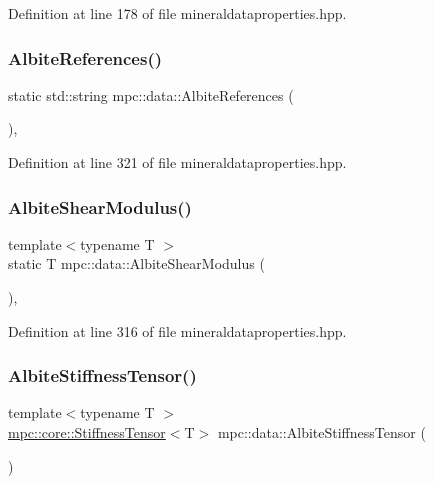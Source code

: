 Definition at line 178 of file mineraldataproperties.\+hpp.

\mbox{\label{namespacempc_1_1data_afa959db50e7cfd9c57b14f7ab5b58888}} 
\subsubsection{\texorpdfstring{Albite\+References()}{AlbiteReferences()}}
{\footnotesize\ttfamily static std\+::string mpc\+::data\+::\+Albite\+References (\begin{DoxyParamCaption}{ }\end{DoxyParamCaption})\hspace{0.3cm}{\ttfamily [inline]}, {\ttfamily [static]}}



Definition at line 321 of file mineraldataproperties.\+hpp.

\mbox{\label{namespacempc_1_1data_afaaeae63580831419afe4a20b13b35cf}} 
\subsubsection{\texorpdfstring{Albite\+Shear\+Modulus()}{AlbiteShearModulus()}}
{\footnotesize\ttfamily template$<$typename T $>$ \\
static T mpc\+::data\+::\+Albite\+Shear\+Modulus (\begin{DoxyParamCaption}{ }\end{DoxyParamCaption})\hspace{0.3cm}{\ttfamily [inline]}, {\ttfamily [static]}}



Definition at line 316 of file mineraldataproperties.\+hpp.

\mbox{\label{namespacempc_1_1data_a0499acadde0327ae922ac340b6231298}} 
\subsubsection{\texorpdfstring{Albite\+Stiffness\+Tensor()}{AlbiteStiffnessTensor()}}
{\footnotesize\ttfamily template$<$typename T $>$ \\
\mbox{\hyperlink{structmpc_1_1core_1_1_stiffness_tensor}{mpc\+::core\+::\+Stiffness\+Tensor}}$<$T$>$ mpc\+::data\+::\+Albite\+Stiffness\+Tensor (\begin{DoxyParamCaption}{ }\end{DoxyParamCaption})}



